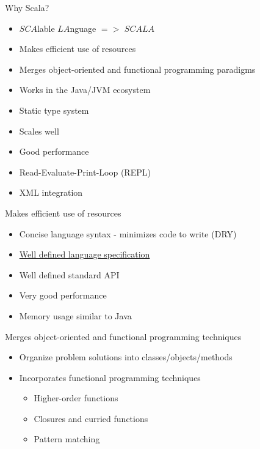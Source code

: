 \documentclass[t]{beamer}
\begin{document}
\begin{frame}{Why Scala?}
  
  \begin{itemize}
  \item $SCA$lable $LA$nguage $=>$ $SCALA$
  \item Makes efficient use of resources
  \item Merges object-oriented and functional programming paradigms
  \item Works in the Java/JVM ecosystem
  \item Static type system
  \item Scales well
  \item Good performance
  \item Read-Evaluate-Print-Loop (REPL)
  \item XML integration
  \end{itemize}
 \end{frame}

\begin{frame}{Makes efficient use of resources}
  \begin{itemize}
  \item Concise language syntax - minimizes code to write (DRY)
  \item \href{http://www.scala-lang.org/sites/default/files/linuxsoft_archives/docu/files/ScalaReference.pdf}{Well defined language specification}
  \item Well defined standard API
  \item Very good performance
  \item Memory usage similar to Java
  \end{itemize}
\note{}
 \end{frame}

\begin{frame}{Merges object-oriented and functional programming techniques}
  \begin{itemize}
  \item Organize problem solutions into classes/objects/methods
  \item Incorporates functional programming techniques
    \begin{itemize}
    \item Higher-order functions
    \item Closures and curried functions
    \item Pattern matching
    \end{itemize}
  \end{itemize}
  \note{}
\end{frame}
\end{document}
